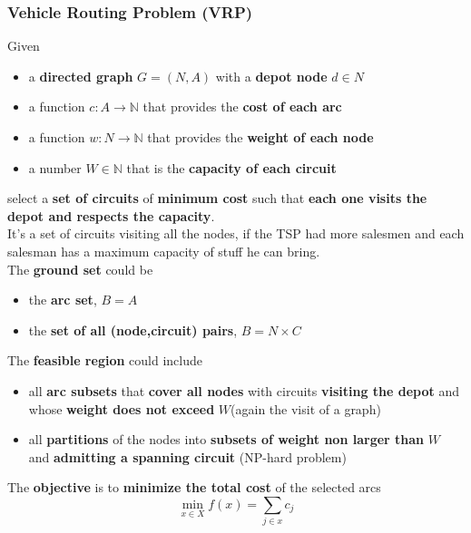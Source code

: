 \documentclass[11pt]{article}
\begin{document}
	\newpage
	
	\subsubsection{Vehicle Routing Problem (VRP)}
	Given
	\begin{itemize}
		\item a \textbf{directed graph} $G = (N, A)$ with a \textbf{depot node} $d \in N$
		\item a function $c : A \rightarrow \mathbb{N}$ that provides the \textbf{cost of each arc}
		\item a function $w : N \rightarrow \mathbb{N}$ that provides the \textbf{weight of each node}
		\item a number $W \in \mathbb{N}$ that is the \textbf{capacity of each circuit}
	\end{itemize}
	select a \textbf{set of circuits} of \textbf{minimum cost} such that \textbf{each one visits the depot and respects the capacity}.\\
	It's a set of circuits visiting all the nodes, if the TSP had more salesmen and each salesman has a maximum capacity of stuff he can bring.\\
	
	The \textbf{ground set} could be
	\begin{itemize}
		\item the \textbf{arc set}, $B = A$
		\item the \textbf{set of all (node,circuit) pairs}, $B = N \times C$
	\end{itemize}
	
	The \textbf{feasible region} could include
	\begin{itemize}
		\item all \textbf{arc subsets} that \textbf{cover all nodes} with circuits \textbf{visiting the depot} and whose \textbf{weight does not exceed} $W $(again the visit of a graph)
		\item all \textbf{partitions} of the nodes into \textbf{subsets of weight non larger than} $W$ and \textbf{admitting a spanning circuit} (NP-hard problem)
	\end{itemize}
	
	The \textbf{objective} is to \textbf{minimize the total cost} of the selected arcs
	$$ \min_{x \in X} f(x) = \sum_{j \in x} c_j $$
	
	\newpage
	
\end{document}
